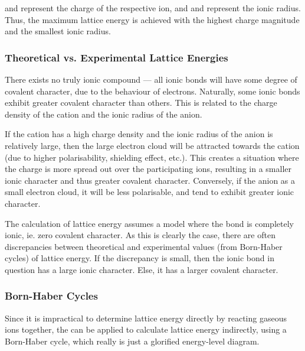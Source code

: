 
			 and  represent the charge of the respective ion, and  and  represent
			the ionic radius. Thus, the maximum lattice energy is achieved with the highest charge magnitude and the smallest ionic radius.


			\subsubsection{Theoretical vs. Experimental Lattice Energies}

				There exists no truly ionic compound --- all ionic bonds will have some degree of covalent character, due to the behaviour of
				electrons. Naturally, some ionic bonds exhibit greater covalent character than others. This is related to the charge density
				of the cation and the ionic radius of the anion.

				If the cation has a high charge density and the ionic radius of the anion is relatively large, then the large electron cloud
				will be attracted towards the cation (due to higher polarisability, shielding effect, etc.). This creates a situation where the
				charge is more spread out over the participating ions, resulting in a smaller ionic character and thus greater covalent
				character. Conversely, if the anion as a small electron cloud, it will be less polarisable, and tend to exhibit greater ionic
				character.

				The calculation of lattice energy assumes a model where the bond is completely ionic, ie. zero covalent character. As this is
				clearly  the case, there are often discrepancies between theoretical and experimental values (from Born-Haber cycles)
				of lattice energy. If the discrepancy is small, then the ionic bond in question has a large ionic character. Else, it has a
				larger covalent character.



			\pagebreak
			\subsubsection{Born-Haber Cycles}

				Since it is impractical to determine lattice energy directly by reacting gaseous ions together, the  can be
				applied to calculate lattice energy indirectly, using a Born-Haber cycle, which really is just a glorified energy-level diagram.

